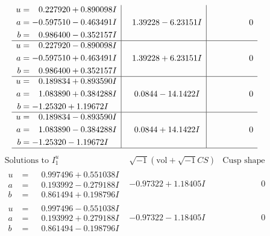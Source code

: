 \documentclass[1p]{elsarticle_modified}
\theoremstyle{definition}
\newcommand{\I}{\sqrt{-1}}
\begin{document}
$$\begin{array}{c|c|c}
\begin{aligned}
u &= \phantom{-}0.227920 + 0.890098 I \\
a &= -0.597510 - 0.463491 I \\
b &= \phantom{-}0.986400 - 0.352157 I\end{aligned}
 & \phantom{-}1.39228 - 6.23151 I & \phantom{-0.000000 } 0 \\ \hline\begin{aligned}
u &= \phantom{-}0.227920 - 0.890098 I \\
a &= -0.597510 + 0.463491 I \\
b &= \phantom{-}0.986400 + 0.352157 I\end{aligned}
 & \phantom{-}1.39228 + 6.23151 I & \phantom{-0.000000 } 0 \\ \hline\begin{aligned}
u &= \phantom{-}0.189834 + 0.893590 I \\
a &= \phantom{-}1.083890 + 0.384288 I \\
b &= -1.25320 + 1.19672 I\end{aligned}
 & \phantom{-}0.0844 - 14.1422 I & \phantom{-0.000000 } 0 \\ \hline\begin{aligned}
u &= \phantom{-}0.189834 - 0.893590 I \\
a &= \phantom{-}1.083890 - 0.384288 I \\
b &= -1.25320 - 1.19672 I\end{aligned}
 & \phantom{-}0.0844 + 14.1422 I & \phantom{-0.000000 } 0\\
 \hline 
 \end{array}$$\newpage$$\begin{array}{c|c|c}  
\text{Solutions to }I^u_{1}& \I (\text{vol} + \sqrt{-1}CS) & \text{Cusp shape}\\
 \hline 
\begin{aligned}
u &= \phantom{-}0.997496 + 0.551038 I \\
a &= \phantom{-}0.193992 - 0.279188 I \\
b &= \phantom{-}0.861494 + 0.198796 I\end{aligned}
 & -0.97322 + 1.18405 I & \phantom{-0.000000 } 0 \\ \hline\begin{aligned}
u &= \phantom{-}0.997496 - 0.551038 I \\
a &= \phantom{-}0.193992 + 0.279188 I \\
b &= \phantom{-}0.861494 - 0.198796 I\end{aligned}
 & -0.97322 - 1.18405 I & \phantom{-0.000000 } 0 \\ \hline\begin{aligned}

\end{aligned}
\end{array}$$
\end{document}
